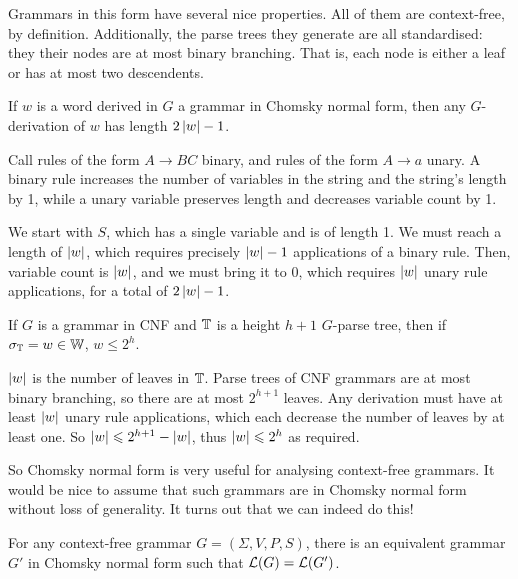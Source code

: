 \documentclass{article}
\begin{document}
Grammars in this form have several nice properties. All of them are context-free, by definition. Additionally, the parse trees they generate are all standardised: they their nodes are at most binary branching. That is, each node is either a leaf or has at most two descendents.

\begin{proposition}
	If $w$ is a word derived in $G$ a grammar in Chomsky normal form, then any $G$-derivation of $w$ has length $2 \left\lvert w \right\rvert - 1$.
\end{proposition}

\begin{prf}
	Call rules of the form $A \to BC$ binary, and rules of the form $A \to a$ unary. A binary rule increases the number of variables in the string and the string's length by 1, while a unary variable preserves length and decreases variable count by 1.
	    
	We start with $S$, which has a single variable and is of length 1. We must reach a length of $\left\lvert w \right\rvert$, which requires precisely $\left\lvert w \right\rvert - 1$ applications of a binary rule. Then, variable count is $\left\lvert w \right\rvert$, and we must bring it to 0, which requires $\left\lvert w \right\rvert$ unary rule applications, for a total of $2 \left\lvert w \right\rvert - 1$.
\end{prf}

\begin{proposition}
	\label{parse-tree-height}
	If $G$ is a grammar in CNF and $\mathbb{T}$ is a height $h+1$ $G$-parse tree, then if $\sigma_{\mathbb{T}} = w \in \mathbb{W}$, $w \leq 2^h$.
\end{proposition}

\begin{prf}
	$\left\lvert w \right\rvert$ is the number of leaves in $\mathbb{T}$. Parse trees of CNF grammars are at most binary branching, so there are at most $2^{h+1}$ leaves. Any derivation must have at least $\left\lvert w \right\rvert$ unary rule applications, which each decrease the number of leaves by at least one. So $\left\lvert w \right\rvert \leqslant 2^{h+1} - \left\lvert w \right\rvert$, thus $\left\lvert w \right\rvert \leqslant 2^h$ as required.
\end{prf}

So Chomsky normal form is very useful for analysing context-free grammars. It would be nice to assume that such grammars are in Chomsky normal form without loss of generality. It turns out that we can indeed do this!

\begin{theorem}
	\label{chomskys-theorem}
	For any context-free grammar $G = (\Sigma, V, P, S)$, there is an equivalent grammar $G'$ in Chomsky normal form such that $\mathcal{L}(G) = \mathcal{L}(G')$.
\end{theorem}
\end{document}
